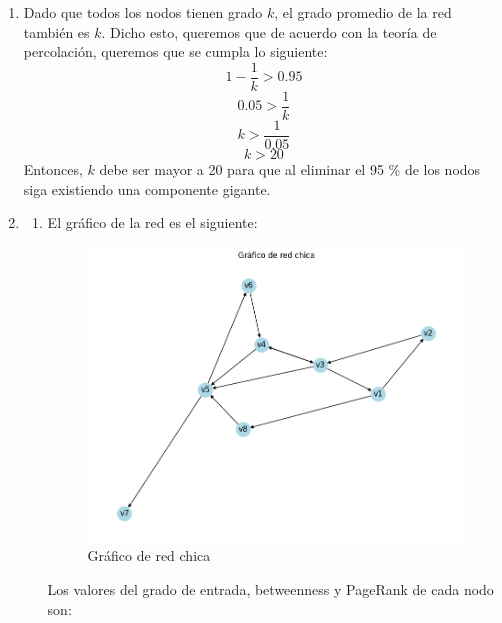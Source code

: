 \documentclass[12pt]{article}
\begin{document}
\begin{enumerate}
    \item Dado que todos los nodos tienen grado $k$, el grado promedio de la red también es $k$. Dicho esto, queremos que de acuerdo con la teoría de percolación, queremos que se cumpla lo siguiente: $$1-\frac{1}{k} > 0.95$$ $$0.05>\frac{1}{k}$$ $$k>\frac{1}{0.05}$$ $$k>20$$ Entonces, $k$ debe ser mayor a 20 para que al eliminar el 95 \% de los nodos siga existiendo una componente gigante.
    
    \item
    \begin{enumerate}
        \item El gráfico de la red es el siguiente:
        \begin{figure}[H]
            \centering
            \includegraphics[scale=0.5]{images/grafico_red_chica.png}
            \caption{Gráfico de red chica}
            \label{fig:graph_red_chica}
        \end{figure}

        Los valores del grado de entrada, betweenness y PageRank de cada nodo son:
        

\end{enumerate}
\end{enumerate}
\end{document}
